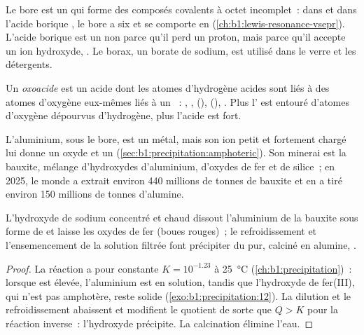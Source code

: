 Le bore est un  qui forme des composés covalents à octet
incomplet~: dans  et dans l'acide borique , le bore a
six  et se comporte en 
(\cref{ch:b1:lewis-resonance-vsepr}). L'acide borique est un  non parce qu'il perd un proton, mais parce qu'il accepte un ion
hydroxyde, . Le borax, un borate de
sodium, est utilisé dans le verre et les détergents.

\begin{definition}[Oxoacide]\label{def:b1:p-block-13-15:oxoacid}
Un \emph{oxoacide} est un acide dont les atomes
d'hydrogène acides sont liés à des atomes d'oxygène eux-mêmes liés à un
~:
, ,  (), 
(), . Plus l' est entouré d'atomes
d'oxygène dépourvus d'hydrogène, plus l'acide est fort.
\end{definition}

L'aluminium, sous le bore, est un métal, mais son ion petit et fortement
chargé lui donne un oxyde et un  (\cref{sec:b1:precipitation:amphoteric}).
Son minerai est la bauxite, mélange d'hydroxydes d'aluminium, d'oxydes de
fer et de silice~; en 2025, le monde a extrait environ 440 millions de
tonnes de bauxite et en a tiré environ 150 millions de tonnes d'alumine.

\begin{proposition}\label{prop:b1:p-block-13-15:bayer}
L'hydroxyde de sodium concentré et chaud dissout l'aluminium de la
bauxite sous forme de
 et laisse les oxydes de fer (boues rouges)~; le
refroidissement et l'ensemencement de la solution filtrée font précipiter
du  pur, calciné en alumine,
.
\end{proposition}

\begin{proof}
La réaction  a pour constante $K = 10^{-1.23}$ à
\qty{25}{\celsius} (\cref{ch:b1:precipitation})~: lorsque \ce{[OH-]} est
élevée, l'aluminium est en solution, tandis que l'hydroxyde de fer(III),
qui n'est pas amphotère, reste solide (\cref{exo:b1:precipitation:12}).
La dilution et le refroidissement abaissent \ce{[OH-]} et modifient le
quotient de sorte que $Q > K$ pour la réaction inverse~: l'hydroxyde
précipite. La calcination élimine l'eau.
\end{proof}

